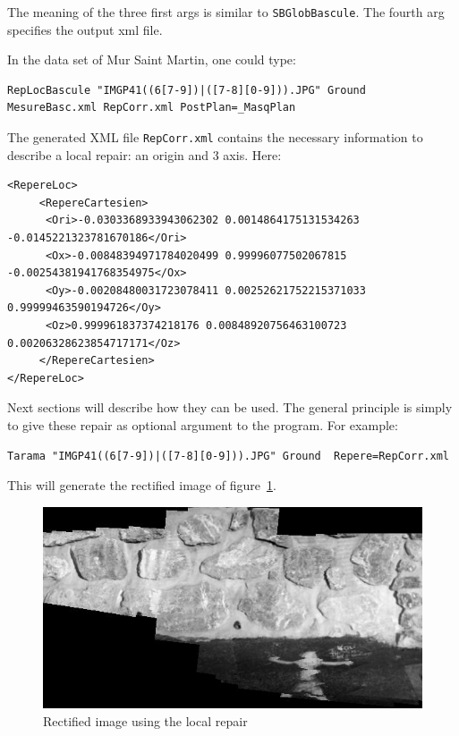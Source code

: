 The meaning of the three first args is similar to {\tt SBGlobBascule}. The fourth
arg specifies the output xml file.

In the data set of Mur Saint Martin, one could type:

\begin{verbatim}
RepLocBascule "IMGP41((6[7-9])|([7-8][0-9])).JPG" Ground MesureBasc.xml RepCorr.xml PostPlan=_MasqPlan
\end{verbatim}

The generated XML file {\tt RepCorr.xml} contains the necessary information to
describe a local repair: an origin and $3$ axis. Here:

\begin{verbatim}
<RepereLoc>
     <RepereCartesien>
	  <Ori>-0.0303368933943062302 0.0014864175131534263 -0.0145221323781670186</Ori>
	  <Ox>-0.00848394971784020499 0.99996077502067815 -0.00254381941768354975</Ox>
	  <Oy>-0.00208480031723078411 0.00252621752215371033 0.99999463590194726</Oy>
	  <Oz>0.999961837374218176 0.00848920756463100723 0.00206328623854717171</Oz>
     </RepereCartesien>
</RepereLoc>
\end{verbatim}

Next sections will describe how they can be used. The general principle is
simply to give these repair as optional argument to the program. For
example:

\begin{verbatim}
Tarama "IMGP41((6[7-9])|([7-8][0-9])).JPG" Ground  Repere=RepCorr.xml
\end{verbatim}

This will generate the rectified image of figure~\ref{FIG:OkRec:StMartin}.

\begin{figure}
\begin{center}
\includegraphics[width=120mm]{FIGS/MurSaintMartin/TA_OK-LeChantier.jpg}
\end{center}
\caption{Rectified image using the local repair}
\label{FIG:OkRec:StMartin}
\end{figure}



